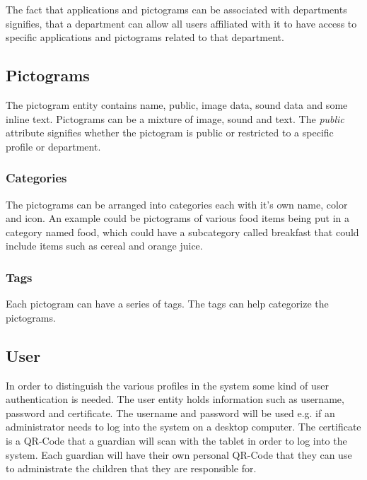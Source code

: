 The fact that applications and pictograms can be associated with departments signifies, that a department can allow all users affiliated with it to have access to specific applications and pictograms related to that department.

\subsection{Pictograms}
The pictogram entity contains name, public, image data, sound data and some inline text. 
Pictograms can be a mixture of image, sound and text. The \emph{public} attribute signifies whether the pictogram is public or restricted to a specific profile or department. 

\subsubsection{Categories}
The pictograms can be arranged into categories each with it's own name, color and icon.
An example could be pictograms of various food items being put in a category named food, which could have a subcategory called breakfast that could include items such as cereal and orange juice.

\subsubsection{Tags}
Each pictogram can have a series of tags. The tags can help categorize the pictograms.

\subsection{User}
In order to distinguish the various profiles in the system some kind of user authentication is needed. The user entity holds information such as username, password and certificate.
The username and password will be used e.g. if an administrator needs to log into the system on a desktop computer. The certificate is a QR-Code that a guardian will scan with the tablet in order to log into the system. Each guardian will have their own personal QR-Code that they can use to administrate the children that they are responsible for.